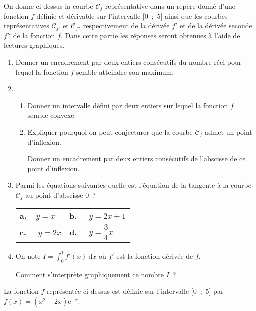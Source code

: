 \medbreak
On donne ci-dessus la courbe $\mathscr{C}_f$ représentative dans un repère donné d'une fonction $f$ définie
et dérivable sur l'intervalle [0~;~5] ainsi que les courbes représentatives $\mathscr{C}_{f'}$ et $\mathscr{C}_{f''}$ respectivement
de la dérivée $f'$ et de la dérivée seconde $f''$ de la fonction $f$.
\medbreak
{}
\medbreak
Dans cette partie les réponses seront obtenues à l'aide de lectures graphiques.
\medbreak
\begin{enumerate}
     \item Donner un encadrement par deux entiers consécutifs du nombre réel pour lequel la
     fonction $f$ semble atteindre son maximum.
     \item
     \begin{enumerate}[label=\alph*.]
          \item Donner un intervalle défini par deux entiers sur lequel la fonction $f$ semble convexe.
          \item Expliquer pourquoi on peut conjecturer que la courbe $\mathscr{C}_f$ admet un point d'inflexion.
          \par
          Donner un encadrement par deux entiers consécutifs de l'abscisse de ce point d'inflexion.
     \end{enumerate}
     \item Parmi les équations suivantes quelle est l'équation de la tangente à la courbe $\mathscr{C}_f$ au point d'abscisse $0$~?
     \begin{center}
          \begin{tabularx}{\linewidth}{XX}%
               \textbf{a.~~}$y=x$&\textbf{b.~~} $y = 2x+ 1$\\
               \textbf{c.~~} $y= 2x$&\textbf{d.~~} $y= \dfrac{3}{4}x$\\
          \end{tabularx}
     \end{center}
     \item On note $I = \displaystyle\int_0^1 f'(x)\:\text{d}x$ où $f'$ est la fonction dérivée de $f$.
     \par
     Comment s'interprète graphiquement ce nombre $I$~?
\end{enumerate}
\bigbreak
{}
\medbreak
La fonction $f$ représentée ci-dessus est définie sur l'intervalle [0~;~5] par $f(x) = \left(x^2 + 2x\right)\text{e}^{-x}$.
\medbreak
